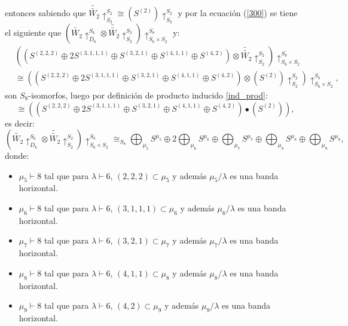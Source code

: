 \documentclass[12pt]{book}
\theoremstyle{definition}
\newcounter{in}
\newcounter{ini}
\begin{document}
entonces sabiendo que $\tilde{\tilde{W_{2}}} \uparrow_{S_{2}}^{S_{2}} \cong (S^{(2)}) \uparrow_{S_{2}}^{S_{2}}$ y por la ecuación (\ref{300}) se tiene el siguiente que $(\tilde{W_{2}} \uparrow_{D_{6}}^{S_{6}} \otimes \tilde{\tilde{W_{2}}} \uparrow_{S_{2}}^{S_{2}}) \uparrow_{S_{6}\times S_{2}}^{S_{8}}$ y:
\begin{equation}
\begin{aligned}
 & ((S^{(2, 2, 2)} \oplus 2S^{(3, 1, 1, 1)} \oplus S^{(3, 2, 1)} \oplus S^{(4, 1, 1)} \oplus S^{(4, 2)}) \otimes \tilde{\tilde{W_{2}}} \uparrow_{S_{2}}^{S_{2}}) \uparrow_{S_{6}\times S_{2}}^{S_{8}} \\
& \cong  ((S^{(2, 2, 2)} \oplus 2S^{(3, 1, 1, 1)} \oplus S^{(3, 2, 1)} \oplus S^{(4, 1, 1)} \oplus S^{(4, 2)}) \otimes (S^{(2)}) \uparrow_{S_{2}}^{S_{2}}) \uparrow_{S_{6}\times S_{2}}^{S_{8}},
\end{aligned}
\end{equation}
son $S_{8}$-isomorfos, luego por definición de producto inducido \ref{ind_prod}:
\begin{equation}
\cong  ((S^{(2, 2, 2)} \oplus 2S^{(3, 1, 1, 1)} \oplus S^{(3, 2, 1)} \oplus S^{(4, 1, 1)} \oplus S^{(4, 2)}) \bullet (S^{(2)})),
\end{equation}
es decir:
\begin{equation*}
(\tilde{W_{2}} \uparrow_{D_{6}}^{S_{6}} \otimes \tilde{\tilde{W_{2}}} \uparrow_{S_{2}}^{S_{2}}) \uparrow_{S_{6}\times S_{2}}^{S_{8}} \cong_{S_{8}} \bigoplus_{\mu_{5}} S^{\mu_{5}} \oplus 2\bigoplus_{\mu_{6}} S^{\mu_{6}} \oplus \bigoplus_{\mu_{7}} S^{\mu_{7}} \oplus \bigoplus_{\mu_{8}} S^{\mu_{8}} \oplus \bigoplus_{\mu_{9}} S^{\mu_{9}},
\end{equation*}
donde:
\begin{itemize}
\item $\mu_{5} \vdash 8$ tal que para $\lambda \vdash 6$, $(2,2,2) \subset \mu_{5}$ y además $\mu_{5} / \lambda$ es una banda horizontal. 
\item $\mu_{6} \vdash 8$ tal que para $\lambda \vdash 6$, $(3,1,1,1) \subset \mu_{6}$ y además $\mu_{6} / \lambda$ es una banda horizontal. 
\item $\mu_{7} \vdash 8$ tal que para $\lambda \vdash 6$, $(3,2,1) \subset \mu_{7}$ y además $\mu_{7} / \lambda$ es una banda horizontal.
\item $\mu_{8} \vdash 8$ tal que para $\lambda \vdash 6$, $(4,1,1) \subset \mu_{8}$ y además $\mu_{8} / \lambda$ es una banda horizontal.
\item $\mu_{9} \vdash 8$ tal que para $\lambda \vdash 6$, $(4,2) \subset \mu_{9}$ y además $\mu_{9} / \lambda$ es una banda horizontal.
\end{itemize}
\end{document}
